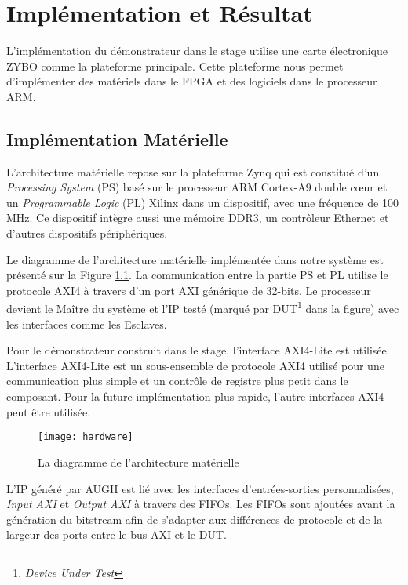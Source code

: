 \chapter{Implémentation et Résultat}
\label{chap:implementation}
L'implémentation du démonstrateur dans le stage utilise une carte électronique ZYBO\cite{zyboweb}
comme la plateforme principale. Cette plateforme nous permet d'implémenter des matériels
dans le FPGA et des logiciels dans le processeur ARM. 

\section{Implémentation Matérielle}

L'architecture matérielle repose sur la plateforme Zynq qui est constitué d'un \emph{Processing System} (PS) 
basé sur le processeur ARM Cortex-A9 double cœur et un \emph{Programmable Logic} (PL) Xilinx dans
un dispositif, avec une fréquence de 100 MHz. Ce dispositif intègre aussi une mémoire DDR3,
un contrôleur Ethernet et d'autres dispositifs périphériques.

Le diagramme de l'architecture matérielle implémentée dans notre système est présenté sur la Figure \ref{fig:hard}.
La communication entre la partie PS et PL utilise le protocole AXI4 à travers d'un port AXI générique
de 32-bits. 
Le processeur devient le Maître du système et l'IP testé (marqué par DUT\footnote{\emph{Device Under Test}} dans la figure)
avec les interfaces comme les Esclaves.

Pour le démonstrateur construit dans le stage, l'interface AXI4-Lite est utilisée.
L'interface AXI4-Lite est un sous-ensemble de protocole AXI4 utilisé pour une communication
plus simple et un contrôle de registre plus petit dans le composant.
Pour la future implémentation plus rapide, l'autre interfaces AXI4 peut être utilisée. 

\begin{figure}[h]
	\centering
	\texttt{[image: hardware]}
	\caption{La diagramme de l'architecture matérielle}
	\label{fig:hard}
	\vspace{-2mm}
\end{figure}

L'IP généré par AUGH est lié avec les interfaces d'entrées-sorties personnalisées,
\emph{Input AXI} et \emph{Output AXI} à travers des FIFOs. Les FIFOs sont ajoutées avant la génération du bitstream
afin de s'adapter aux différences de protocole et de la largeur des ports entre le bus AXI et le DUT.

